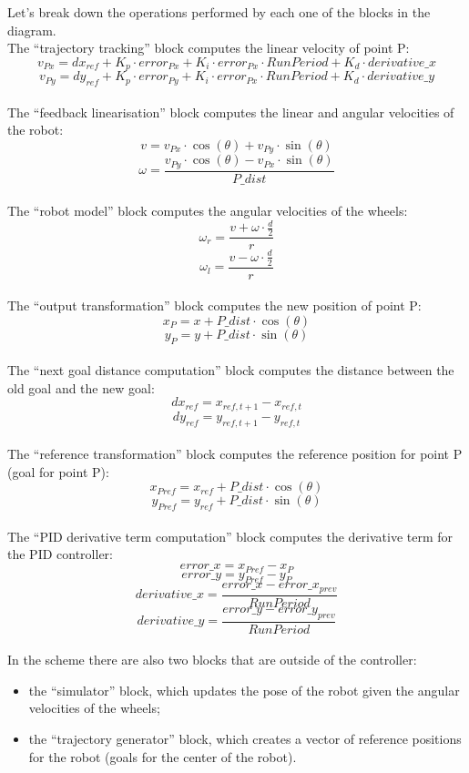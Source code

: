 \documentclass[11pt,a4paper]{article}
\begin{document}
Let's break down the operations performed by each one of the blocks in the diagram.\\

The ``trajectory tracking'' block computes the linear velocity of point P:
$$v_{Px} = dx_{ref} + K_p \cdot error_{Px} + K_i \cdot error_{Px} \cdot RunPeriod + K_d \cdot derivative\_x$$
$$v_{Py} = dy_{ref} + K_p \cdot error_{Py} + K_i \cdot error_{Px} \cdot RunPeriod + K_d \cdot derivative\_y$$ \\

The ``feedback linearisation'' block computes the linear and angular velocities of the robot:
$$v = v_{Px} \cdot \cos(\theta)  +  v_{Py} \cdot \sin(\theta)$$
$$\omega = \frac {v_{Py} \cdot \cos(\theta)  - v_{Px} \cdot \sin(\theta)}{P\_dist}$$ \\

The ``robot model'' block computes the angular velocities of the wheels:
$$\omega_r = \frac {v + \omega \cdot \frac{d}{2}}{r}$$
$$\omega_l = \frac {v - \omega \cdot \frac{d}{2}}{r}$$ \\

The ``output transformation'' block computes the new position of point P:
$$x_P = x + P\_dist \cdot \cos(\theta)$$
$$y_P = y + P\_dist \cdot \sin(\theta)$$ \\

The ``next goal distance computation'' block computes the distance between the old goal and the new goal:
$$dx_{ref} = x_{ref,t+1} - x_{ref,t} $$
$$dy_{ref} = y_{ref,t+1} - y_{ref,t} $$ \\

The ``reference transformation'' block computes the reference position for point P (goal for point P):
$$x_{Pref} = x_{ref} + P\_dist \cdot \cos(\theta)$$
$$y_{Pref} = y_{ref} + P\_dist \cdot \sin(\theta)$$ \\

The ``PID derivative term computation'' block computes the derivative term for the PID controller:
$$error\_x = x_{Pref} - x_P$$
$$error\_y = y_{Pref} - y_P$$
$$derivative\_x = \frac {error\_x - error\_x_{prev}}{RunPeriod}$$
$$derivative\_y = \frac {error\_y - error\_y_{prev}}{RunPeriod}$$ \\

In the scheme there are also two blocks that are outside of the controller:
\begin{itemize}
    \item the ``simulator'' block, which updates the pose of the robot given the angular velocities of the wheels;
    \item the ``trajectory generator'' block, which creates a vector of reference positions for the robot
            (goals for the center of the robot).
\end{itemize}
\end{document}
